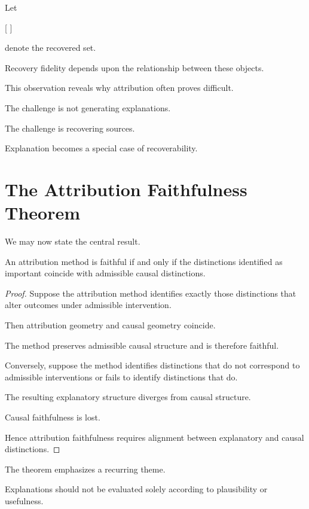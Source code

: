 \documentclass[11pt,oneside,openany]{book}
\begin{document}
Let

[
]

denote the recovered set.

Recovery fidelity depends upon the relationship between these objects.

This observation reveals why attribution often proves difficult.

The challenge is not generating explanations.

The challenge is recovering sources.

Explanation becomes a special case of recoverability.

\section{The Attribution Faithfulness Theorem}

We may now state the central result.

\begin{theorem}

An attribution method is faithful if and only if the distinctions identified as important coincide with admissible causal distinctions.

\end{theorem}

\begin{proof}

Suppose the attribution method identifies exactly those distinctions that alter outcomes under admissible intervention.

Then attribution geometry and causal geometry coincide.

The method preserves admissible causal structure and is therefore faithful.

Conversely, suppose the method identifies distinctions that do not correspond to admissible interventions or fails to identify distinctions that do.

The resulting explanatory structure diverges from causal structure.

Causal faithfulness is lost.

Hence attribution faithfulness requires alignment between explanatory and causal distinctions.

\end{proof}

The theorem emphasizes a recurring theme.

Explanations should not be evaluated solely according to plausibility or usefulness.
\end{document}
